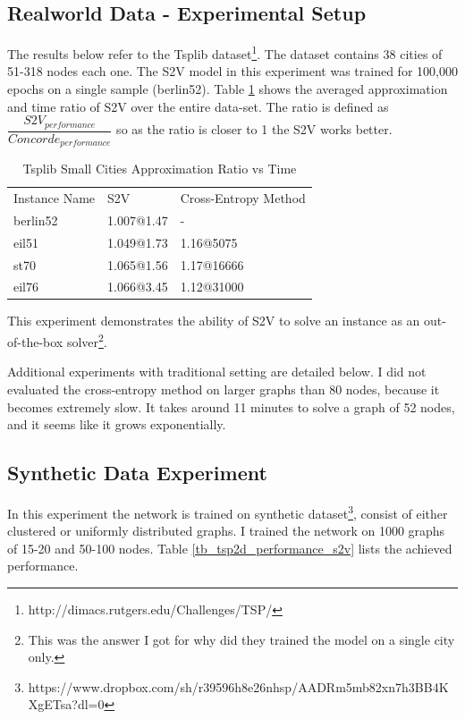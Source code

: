 \documentclass[10pt,a4paper,draft]{article}
\begin{document}
\subsection*{Realworld Data - Experimental Setup}
	The results below refer to the Tsplib dataset\footnote{http://dimacs.rutgers.edu/Challenges/TSP/}. The dataset contains 38 cities of 51-318 nodes each one.
	The S2V model in this experiment was trained for 100,000 epochs on a single sample (berlin52). 
	Table \ref{tb_tsplib_performance_s2v_vs_ce} shows the averaged approximation and time ratio of S2V over the entire data-set. The ratio is defined as $\dfrac{S2V_{performance}}{Concorde_{performance}} $ so as the ratio is closer to 1 the S2V works better.
	
	\begin{table}[h] \centering
	\begin{tabular}{lll}
	 	Instance Name	& S2V   		& Cross-Entropy Method 	\\
	 	berlin52 		& 1.007@1.47	& - 					\\
		eil51  			& 1.049@1.73	& 1.16@5075				\\
		st70 			& 1.065@1.56 	& 1.17@16666 			\\
		eil76			& 1.066@3.45 	& 1.12@31000
	\end{tabular}
	\caption{Tsplib Small Cities Approximation Ratio vs Time} 
	\label{tb_tsplib_performance_s2v_vs_ce}
	\end{table}
	This experiment demonstrates the ability of S2V to solve an instance as an out-of-the-box solver\footnote{This was the answer I got for why did they trained the model on a single city only.}. 
	
	Additional experiments with traditional setting are detailed below. I did not evaluated the cross-entropy method on larger graphs than 80 nodes, because it becomes extremely slow. It takes around 11 minutes to solve a graph of 52 nodes, and it seems like it grows exponentially.
	

\subsection*{Synthetic Data Experiment}
In this experiment the network is trained on synthetic dataset\footnote{https://www.dropbox.com/sh/r39596h8e26nhsp/AADRm5mb82xn7h3BB4KXgETsa?dl=0}, consist of either clustered or uniformly distributed graphs.
I trained the network on 1000 graphs of 15-20 and 50-100 nodes. Table \ref{tb_tsp2d_performance_s2v} lists the achieved performance. 
\end{document}
